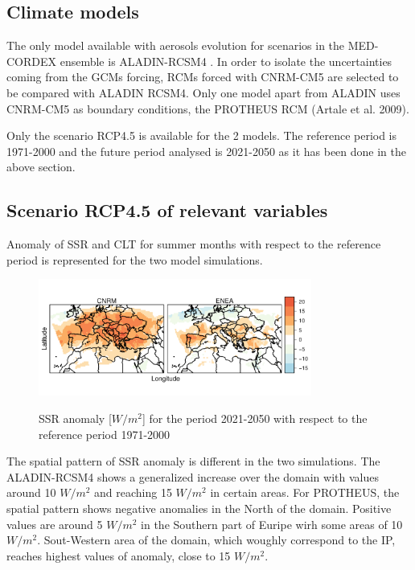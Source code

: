 \subsection{Climate models}

The only model available with aerosols evolution for scenarios in the MED-CORDEX ensemble is ALADIN-RCSM4 \cite*{Sevault2014}. In order to isolate the uncertainties coming from the GCMs forcing, RCMs forced with CNRM-CM5 are selected to be compared with ALADIN RCSM4. Only one model apart from ALADIN uses CNRM-CM5 as boundary conditions, the PROTHEUS RCM (Artale et al. 2009).

Only the scenario RCP4.5 is available for the 2 models. The reference period is 1971-2000 and the future period analysed is 2021-2050 as it has been done in the above section.


\subsection{Scenario RCP4.5 of relevant variables}

Anomaly of SSR and CLT for summer months with respect to the reference period is represented for the two model simulations.

\begin{figure}[h!]
    \includegraphics[width=0.8\textwidth]{figs/capitulo7/diferences_ssr_newperiods_9abr.pdf}
    \label{fig:medcordexssr}
  \caption{SSR anomaly [$W/m^2$] for the period 2021-2050 with respect to the reference period 1971-2000}
\end{figure}

The spatial pattern of SSR anomaly is different in the two simulations. The ALADIN-RCSM4 shows a generalized increase over the domain with values around 10 $W/m^2$ and reaching 15 $W/m^2$  in certain areas. For PROTHEUS, the spatial pattern shows negative anomalies in the North of the domain. Positive values are around 5 $W/m^2$ in the Southern part of Euripe wirh some areas of 10 $W/m^2$. Sout-Western area of the domain, which woughly correspond to the IP, reaches highest values of anomaly, close to 15 $W/m^2$.

